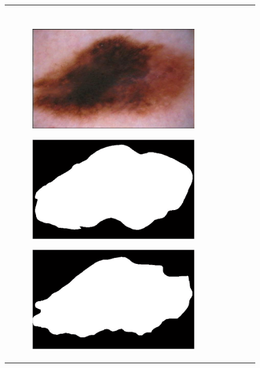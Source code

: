 \documentclass[a4paper, 10pt, conference]{ieeeconf}        %
\begin{document}
\begin{figure}[ht!]
\begin{tabular}{c c c c c}
\begin{subfigure}{0.2\textwidth}
      \end{subfigure} \\ \\
       \begin{subfigure}{0.2\textwidth}
       \includegraphics[scale=0.15]{original04.JPG}
       \end{subfigure}
       \begin{subfigure}{0.2\textwidth}
       \includegraphics[scale=0.2]{expert_1GroundTrue_04.JPG}
       \end{subfigure}
       \begin{subfigure}{0.2\textwidth}
        \includegraphics[scale=0.2]{expert_2GroundTrue_04.JPG}

\end{subfigure}
\end{tabular}
\end{figure}
\end{document}
